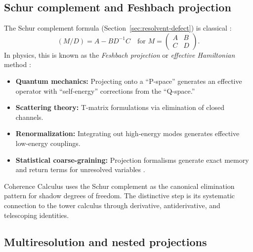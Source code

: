 \subsection{Schur complement and Feshbach projection}
\label{subsec:schur-feshbach}

The Schur complement formula (Section~\ref{sec:resolvent-defect}) is classical
\cite{Haynsworth1968,Zhang2005}:
\[
(M/D) = A - BD^{-1}C \quad \text{for } M = \begin{pmatrix} A & B \\ C & D \end{pmatrix}.
\]
In physics, this is known as the \emph{Feshbach projection} or \emph{effective Hamiltonian} method
\cite{Feshbach1958,Feshbach1962}:
\begin{itemize}[itemsep=0.2em]
\item \textbf{Quantum mechanics:} Projecting onto a ``P-space'' generates an effective operator with ``self-energy'' corrections from the ``Q-space.''
\item \textbf{Scattering theory:} T-matrix formulations via elimination of closed channels.
\item \textbf{Renormalization:} Integrating out high-energy modes generates effective low-energy couplings.
\item \textbf{Statistical coarse-graining:} Projection formalisms generate exact memory and return terms for unresolved variables \cite{Zwanzig1961,Mori1965,ChorinHaldKupferman2000}.
\end{itemize}
Coherence Calculus uses the Schur complement as the canonical elimination
pattern for shadow degrees of freedom. The distinctive step is its systematic
connection to the tower calculus through derivative, antiderivative, and
telescoping identities.

\subsection{Multiresolution and nested projections}
\label{subsec:multiresolution}

